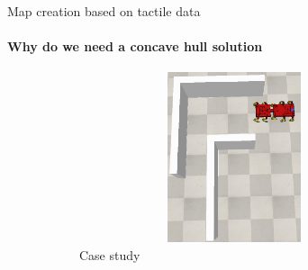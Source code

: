 \documentclass[aspectratio=169,xcolor=table]{beamer}
\begin{document}
\begin{frame}[t]{Map creation based on tactile data}
    \framesubtitle{Why do we need a concave hull solution}
    \vspace{-15pt}
    \begin{figure}[H]
        \begin{subfigure}[t]{0.3\textwidth}
            \centering\includegraphics[height=5cm,width=1\textwidth,keepaspectratio]{convex_terr.png}
            \caption*{Case study}
            \label{fig:convex_terr.png}
        \end{subfigure}
        \hfill
        \begin{subfigure}[t]{0.33\textwidth}
                \centering
\end{subfigure}
\end{figure}
\end{frame}
\end{document}
